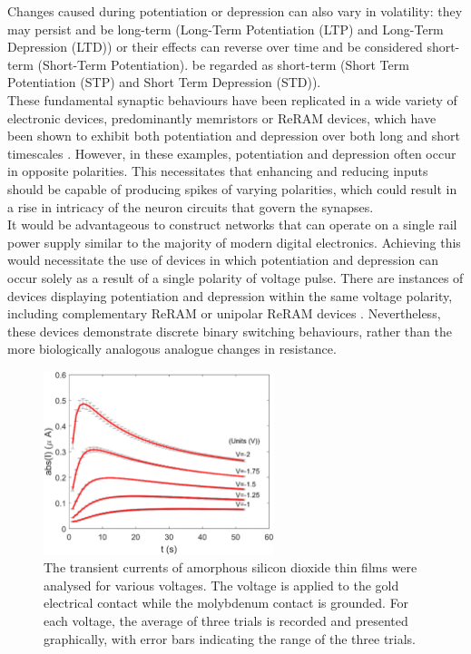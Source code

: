 \noindent Changes caused during potentiation or depression can also vary in volatility: they may persist and be long-term (Long-Term Potentiation (LTP) and Long-Term Depression (LTD)) or their effects can reverse over time and be considered short-term (Short-Term Potentiation). be regarded as short-term (Short Term Potentiation (STP) and Short Term Depression (STD)).\\

\noindent These fundamental synaptic behaviours have been replicated in a wide variety of electronic devices, predominantly memristors or ReRAM devices, which have been shown to exhibit both potentiation and depression over both long and short timescales \cite{jo2010nanoscale}. However, in these examples, potentiation and depression often occur in opposite polarities. This necessitates that enhancing and reducing inputs should be capable of producing spikes of varying polarities, which could result in a rise in intricacy of the neuron circuits that govern the synapses.\\

\noindent It would be advantageous to construct networks that can operate on a single rail power supply similar to the majority of modern digital electronics. Achieving this would necessitate the use of devices in which potentiation and depression can occur solely as a result of a single polarity of voltage pulse. There are instances of devices displaying potentiation and depression within the same voltage polarity, including complementary ReRAM \cite{khan2020comparison} or unipolar ReRAM devices \cite{mehonic2012electrically}. Nevertheless, these devices demonstrate discrete binary switching behaviours, rather than the more biologically analogous analogue changes in resistance.\\


\begin{figure}[htbp!] 
    \centering    
    \includegraphics[width=0.6\textwidth]{Chapter4/Figs/e.png}
    \caption[The voltage dependence of the current transient in the subthreshold regime.]{The transient currents of amorphous silicon dioxide thin films were analysed for various voltages. The voltage is applied to the gold electrical contact while the molybdenum contact is grounded. For each voltage, the average of three trials is recorded and presented graphically, with error bars indicating the range of the three trials.}
    \label{fig:4e}
    \end{figure}
    
